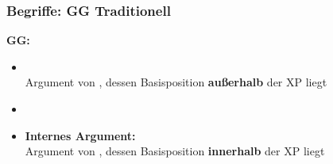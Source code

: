 \begin{frame}
\frametitle{Begriffe: GG \vs Traditionell}

\begin{minipage}[b]{0.47\textwidth}

	\textbf{GG:}

	\begin{itemize}
		\item {}\\
		Argument von , dessen Basisposition \textbf{außerhalb} der XP liegt
		\item[]
		\item \textbf{Internes Argument:}\\
		Argument von , dessen Basisposition \textbf{innerhalb} der XP liegt
	\end{itemize}	
\end{minipage}  
\begin{minipage}[b]{0.48\textwidth}
	\begin{figure}
	\centering
	\end{figure}
\end{minipage}    

\end{frame}


